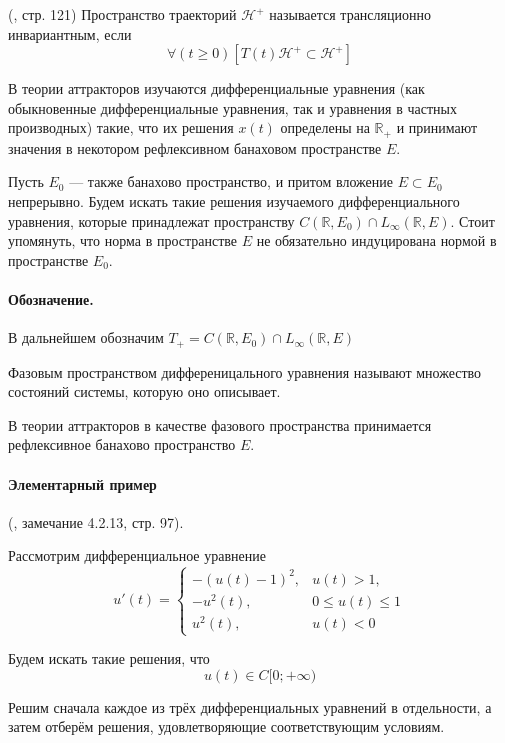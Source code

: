 \opred (\cite{Zelenaya}, стр. 121)
Пространство траекторий $\mathcal{H}^+$ называется трансляционно инвариантным, если
$$
\forall(t \geq 0)\left[T(t)\mathcal{H}^+ \subset \mathcal{H}^+ \right]
$$


В теории аттракторов изучаются дифференциальные уравнения (как обыкновенные дифференциальные уравнения, так и уравнения в частных производных) такие, что их решения $x(t)$ определены на $\mathbb{R}_+$ и принимают значения в некотором рефлексивном банаховом пространстве $E$.

Пусть $E_0$ --- также банахово пространство, и притом вложение $E \subset E_0$ непрерывно.
Будем искать такие решения изучаемого дифференциального уравнения, которые принадлежат пространству $C(\mathbb{R},E_0) \cap L_\infty(\mathbb{R},E)$.
Стоит упомянуть, что норма в пространстве $E$ не обязательно индуцирована нормой в пространстве $E_0$.

\paragraph{Обозначение.}
В дальнейшем обозначим $T_+ = C(\mathbb{R},E_0) \cap L_\infty(\mathbb{R},E)$

\opred
Фазовым пространством дифференицального уравнения называют множество состояний системы, которую оно описывает.

В теории аттракторов в качестве фазового пространства принимается рефлексивное банахово пространство $E$.


\paragraph{Элементарный пример} (\cite{Vorotnikov}, замечание 4.2.13, стр. 97).

Рассмотрим дифференциальное уравнение
\begin{equation}\label{primer_iz_statyi}
	u'(t)=
	\left\{
		\begin{array}{ll}
			-(u(t)-1)^2, & u(t) > 1, \\
			-u^2 (t)   , & 0 \leq u(t) \leq 1 \\
			u^2 (t)    , & u(t) < 0
		\end{array}
	\right.
\end{equation}


Будем искать такие решения, что
\begin{equation}
	u(t) \in C[0; +\infty)
\end{equation}

Решим сначала каждое из трёх дифференциальных уравнений в отдельности, а затем отберём решения,
удовлетворяющие соответствующим условиям.

